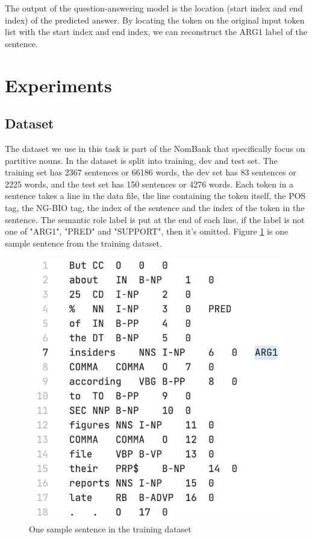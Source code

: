 \documentclass[11pt]{article}
\begin{document}
The output of the question-answering model is the location (start index and end index) of the predicted answer. By locating the token on the original input token list with the start index and end index, we can reconstruct the ARG1 label of the sentence.

\section{Experiments}

\subsection{Dataset}

The dataset we use in this task is part of the NomBank that specifically focus on partitive nouns. In the dataset is split into training, dev and test set. The training set has 2367 sentences or 66186 words, the dev set has 83 sentences or 2225 words, and the test set has 150 sentences or 4276 words. Each token in a sentence takes a line in the data file, the line containing the token itself, the POS tag, the NG-BIO tag, the index of the sentence and the index of the token in the sentence. The semantic role label is put at the end of each line, if the label is not one of "ARG1", "PRED" and "SUPPORT", then it's omitted. Figure \ref{fig:dataset-one-sample} is one sample sentence from the training dataset.

\begin{figure}[h]
  \centering
  \includegraphics[width=\linewidth]{assets/dataset-one-sample.png}
  \caption{One sample sentence in the training dataset}
  \label{fig:dataset-one-sample}
\end{figure}
\end{document}
